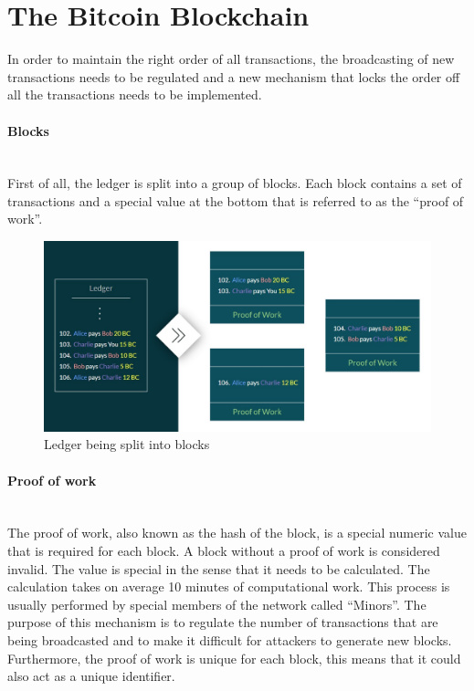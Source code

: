 \documentclass[a4paper, 12pt]{report}
\begin{document}
\section{The Bitcoin Blockchain}
\par In order to maintain the right order of all transactions, the broadcasting of new transactions needs to be regulated and a new mechanism that locks the order off all the transactions needs to be implemented.
\paragraph{Blocks} \hspace{0pt} \\
First of all, the ledger is split into a group of blocks. Each block contains a set of transactions and a special value at the bottom that is referred to as the “proof of work”. 

\begin{figure}[h]
	\includegraphics[width=\textwidth]{02_Ledger_Blocks}
	\caption{Ledger being split into blocks}
	\label{fig:02_Ledger_Blocks}
\end{figure}

\paragraph{Proof of work} \hspace{0pt} \\
The proof of work, also known as the hash of the block, is a special numeric value that is required for each block. A block without a proof of work is considered invalid. The value is special in the sense that it needs to be calculated. The calculation takes on average 10 minutes of computational work. This process is usually performed by special members of the network called “Minors”. The purpose of this mechanism is to regulate the number of transactions that are being broadcasted and to make it difficult for attackers to generate new blocks. Furthermore, the proof of work is unique for each block, this means that it could also act as a unique identifier.
\end{document}
